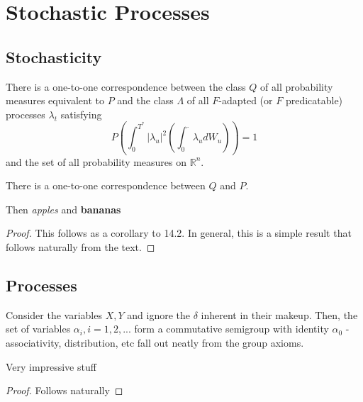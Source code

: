 \chapter{Stochastic Processes}

\section{Stochasticity}
\begin{defn}
  There is a one-to-one correspondence between the class $Q$ of all
  probability measures equivalent to $P$ and the class $\Lambda$ of
  all $F$-adapted (or $F$ predicatable) processes $\lambda_{t}$
  satisfying
  \begin{equation}
    P \left(\int_{0}^{T^{*}} |\lambda_{u}|^{2} \left(\int_{0}^{\cdot}
        \lambda_{u} dW_{u} \right) \right) = 1
  \end{equation}
  and the set of all probability measures on $\mathbb{R}^{n}$.
\end{defn}

\begin{thm}
  There is a one-to-one correspondence between $Q$ and $P$. 
\end{thm}

Then \emph{apples} and \textbf{bananas}

\begin{proof}
  This follows as a corollary to 14.2.  In general, this is a simple
  result that follows naturally from the text.
\end{proof}

\section{Processes}
\label{sec:processes}

Consider the variables $X, Y$ and ignore the $\delta$ inherent in
their makeup. Then, the set of variables $\alpha_{i}, i = 1, 2, ...$
form a commutative semigroup with identity $\alpha_{0}$ -
associativity, distribution, etc fall out neatly from the group
axioms.

\begin{defn}
  Very impressive stuff
\end{defn}

\begin{proof}
  Follows naturally
\end{proof}

